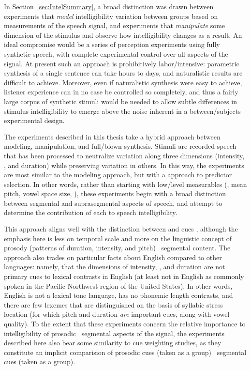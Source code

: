 
In Section~\ref{sec:IntelSummary}, a broad distinction was drawn between experiments that \emph{model} intelligibility variation between groups based on measurements of the speech signal, and experiments that \emph{manipulate} some dimension of the stimulus and observe how intelligibility changes as a result.  An ideal compromise would be a series of perception experiments using fully synthetic speech, with complete experimental control over all aspects of the signal.  At present such an approach is prohibitively labor\-/intensive: parametric synthesis of a single sentence can take hours to days, and naturalistic results are difficult to achieve.  Moreover, even if naturalistic synthesis were easy to achieve, listener experience can in no case be controlled so completely, and thus a fairly large corpus of synthetic stimuli would be needed to allow subtle differences in stimulus intelligibility to emerge above the noise inherent in a between\-/subjects experimental design.

The experiments described in this thesis take a hybrid approach between modeling, manipulation, and full\-/blown synthesis.  Stimuli are recorded speech that has been processed to neutralize variation along three dimensions (intensity, \fo, and duration) while preserving variation in others.  In this way, the experiments are most similar to the modeling approach, but with a  approach to predictor selection.  In other words, rather than starting with low\-/level measurables (\eg, mean pitch, vowel space size, \etc), these experiments begin with a broad distinction between segmental and suprasegmental aspects of speech, and attempt to determine the contribution of each to speech intelligibility.  

This approach aligns well with the distinction between  and  cues \citep{Rosen1992}, although the emphasis here is less on temporal scale and more on the linguistic concept of prosody (patterns of duration, intensity, and pitch) \vs\ segmental content.\footnotemark{}  The approach also trades on particular facts about English compared to other languages: namely, that the dimensions of intensity, \fo, and duration are not primary cues to lexical contrasts in English (at least not in English as commonly spoken in the Pacific Northwest region of the United States).  In other words, English is not a lexical tone language, has no phonemic length contrasts, and there are few lexemes that are distinguished on the basis of syllabic stress location (for which pitch and duration \emph{are} important cues, along with vowel quality).  To the extent that these experiments concern the relative importance to intelligibility of prosodic \vs\ segmental aspects of the signal, the experiments described here also bear some similarity to cue weighting studies, as they constitute an implicit comparision of prosodic cues (taken as a group) \vs\ segmental cues (taken as a group).

